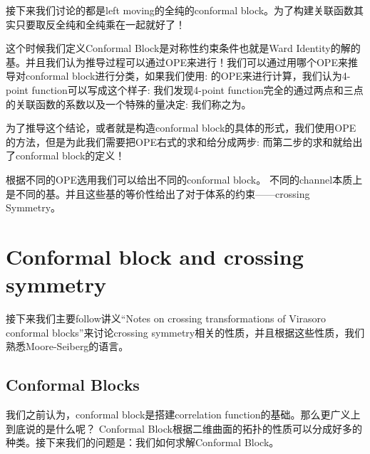 接下来我们讨论的都是left moving的全纯的conformal block。为了构建关联函数其实只要取反全纯和全纯乘在一起就好了！

这个时候我们定义Conformal Block是对称性约束条件也就是Ward Identity的解的基。并且我们认为推导过程可以通过OPE来进行！我们可以通过用哪个OPE来推导对conformal block进行分类，如果我们使用:
的OPE来进行计算，我们认为4-point function可以写成这个样子:
我们发现4-point function完全的通过两点和三点的关联函数的系数以及一个特殊的量决定:
我们称之为。

为了推导这个结论，或者就是构造conformal block的具体的形式，我们使用OPE的方法，但是为此我们需要把OPE右式的求和给分成两步:
而第二步的求和就给出了conformal block的定义！

根据不同的OPE选用我们可以给出不同的conformal block。
不同的channel本质上是不同的基。并且这些基的等价性给出了对于体系的约束——crossing Symmetry。

\newpage
\section{Conformal block and crossing symmetry}
接下来我们主要follow讲义“Notes on crossing transformations of  Virasoro conformal blocks”来讨论crossing symmetry相关的性质，并且根据这些性质，我们熟悉Moore-Seiberg的语言。

\subsection{Conformal Blocks}
我们之前认为，conformal block是搭建correlation function的基础。那么更广义上到底说的是什么呢？
Conformal Block根据二维曲面的拓扑的性质可以分成好多的种类。接下来我们的问题是：我们如何求解Conformal Block。

